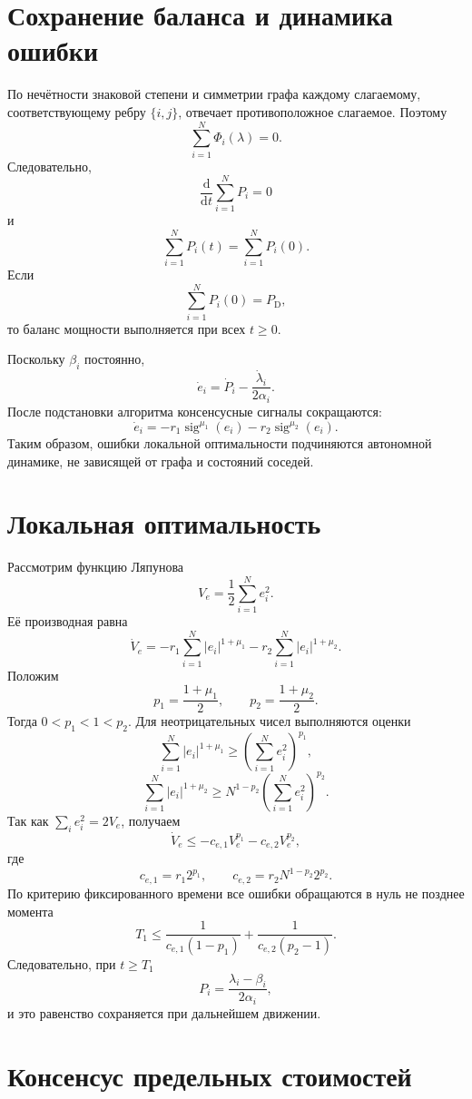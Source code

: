 \section{Сохранение баланса и динамика ошибки}

По нечётности знаковой степени и симметрии графа каждому слагаемому,
соответствующему ребру \(\{i,j\}\), отвечает противоположное
слагаемое. Поэтому
\[
    \sum_{i=1}^{N}\Phi_i(\lambda)=0.
\]
Следовательно,
\[
    \frac{\mathrm d}{\mathrm dt}
    \sum_{i=1}^{N}P_i=0
\]
и
\[
    \sum_{i=1}^{N}P_i(t)
    =
    \sum_{i=1}^{N}P_i(0).
\]
Если
\[
    \sum_{i=1}^{N}P_i(0)=P_{\mathrm D},
\]
то баланс мощности выполняется при всех \(t\ge0\).

Поскольку \(\beta_i\) постоянно,
\[
    \dot e_i
    =
    \dot P_i-
    \frac{\dot\lambda_i}{2\alpha_i}.
\]
После подстановки алгоритма консенсусные сигналы сокращаются:
\[
    \dot e_i
    =
    -r_1\operatorname{sig}^{\mu_1}(e_i)
    -r_2\operatorname{sig}^{\mu_2}(e_i).
\]
Таким образом, ошибки локальной оптимальности подчиняются автономной
динамике, не зависящей от графа и состояний соседей.

\section{Локальная оптимальность}

Рассмотрим функцию Ляпунова
\[
    V_e=\frac12\sum_{i=1}^{N}e_i^2.
\]
Её производная равна
\[
    \dot V_e
    =
    -r_1\sum_{i=1}^{N}|e_i|^{1+\mu_1}
    -r_2\sum_{i=1}^{N}|e_i|^{1+\mu_2}.
\]
Положим
\[
    p_1=\frac{1+\mu_1}{2},
    \qquad
    p_2=\frac{1+\mu_2}{2}.
\]
Тогда \(0<p_1<1<p_2\). Для неотрицательных чисел выполняются
оценки
\[
    \sum_{i=1}^{N}|e_i|^{1+\mu_1}
    \ge
    \left(
        \sum_{i=1}^{N}e_i^2
    \right)^{p_1},
\]
\[
    \sum_{i=1}^{N}|e_i|^{1+\mu_2}
    \ge
    N^{1-p_2}
    \left(
        \sum_{i=1}^{N}e_i^2
    \right)^{p_2}.
\]
Так как \(\sum_i e_i^2=2V_e\), получаем
\[
    \dot V_e
    \le
    -c_{e,1}V_e^{p_1}
    -c_{e,2}V_e^{p_2},
\]
где
\[
    c_{e,1}=r_1 2^{p_1},
    \qquad
    c_{e,2}=r_2N^{1-p_2}2^{p_2}.
\]
По критерию фиксированного времени все ошибки обращаются в нуль не
позднее момента
\[
    T_1
    \le
    \frac1{c_{e,1}(1-p_1)}
    +
    \frac1{c_{e,2}(p_2-1)}.
\]
Следовательно, при \(t\ge T_1\)
\[
    P_i
    =
    \frac{\lambda_i-\beta_i}{2\alpha_i},
\]
и это равенство сохраняется при дальнейшем движении.

\section{Консенсус предельных стоимостей}

